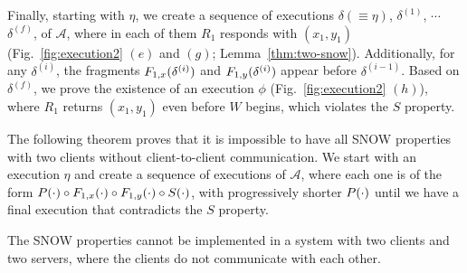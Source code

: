     Finally, starting with  $\eta$, we create a sequence of executions $\delta (\equiv \eta)$, $\delta^{(1)}$, $\cdots$ $\delta^{(f)}$, of $\mathcal{A}$, 
     where in each of them $R_1$ responds with $(x_1, y_1)$  (Fig.~\ref{fig:execution2} $(e)$ and $(g)$; Lemma~\ref{thm:two-snow}). Additionally,  for any $\delta^{(i)}$, the fragments   ${ F_{1,x}(\delta^{(i)})}$ and
    ${ F_{1,y}(\delta^{(i)})}$  appear before $\delta^{(i-1)}$.
    Based on $\delta^{(f)}$, we prove the existence of an execution $\phi$ (Fig.~\ref{fig:execution2} $(h)$), where $R_1$ returns 
    $(x_1, y_1)$ even before $W$ begins, which violates the $S$ property.




  The following theorem proves that it is impossible to have all SNOW properties with two clients without client-to-client communication. We start with an execution $\eta$ and create a sequence of executions of 
  $\mathcal{A}$, where each one is of the form ${ P(\cdot)} \circ { F_{1,x}(\cdot)}\circ { F_{1,y}(\cdot)}\circ { S(\cdot)}$, with progressively shorter ${ P(\cdot)}$ until we have a final execution that contradicts the $S$ property.

 \begin{theorem}\label{thm:two-snow}
 The SNOW properties cannot be implemented in a system with two clients and two servers, where the clients do not communicate with each other.
\end{theorem}



